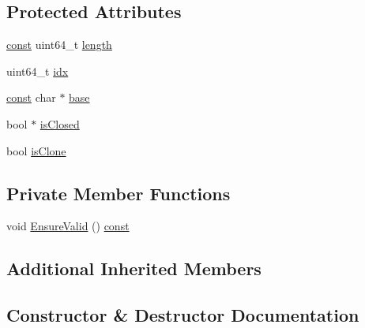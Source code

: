 \subsection*{Protected Attributes}
\begin{DoxyCompactItemize}
\item 
\mbox{\hyperlink{ZlibCrc32_8h_a2c212835823e3c54a8ab6d95c652660e}{const}} uint64\+\_\+t \mbox{\hyperlink{classlucene_1_1core_1_1store_1_1ByteBufferIndexInput_acc7f63d7cbe6fe5047d6f2ef2d3f28bf}{length}}
\item 
uint64\+\_\+t \mbox{\hyperlink{classlucene_1_1core_1_1store_1_1ByteBufferIndexInput_aa510850cba346941ab86be69a7d2233a}{idx}}
\item 
\mbox{\hyperlink{ZlibCrc32_8h_a2c212835823e3c54a8ab6d95c652660e}{const}} char $\ast$ \mbox{\hyperlink{classlucene_1_1core_1_1store_1_1ByteBufferIndexInput_a71a9d4cb7cb207d2db8f8ed32c9fcf2b}{base}}
\item 
bool $\ast$ \mbox{\hyperlink{classlucene_1_1core_1_1store_1_1ByteBufferIndexInput_a9a52acb361a9ac261f4477d464c14241}{is\+Closed}}
\item 
bool \mbox{\hyperlink{classlucene_1_1core_1_1store_1_1ByteBufferIndexInput_a972eb08d337dcec62b415784f6aa2788}{is\+Clone}}
\end{DoxyCompactItemize}
\subsection*{Private Member Functions}
\begin{DoxyCompactItemize}
\item 
void \mbox{\hyperlink{classlucene_1_1core_1_1store_1_1ByteBufferIndexInput_a13d27be6b5df008a8fd9f6c6871ce8bc}{Ensure\+Valid}} () \mbox{\hyperlink{ZlibCrc32_8h_a2c212835823e3c54a8ab6d95c652660e}{const}}
\end{DoxyCompactItemize}
\subsection*{Additional Inherited Members}


\subsection{Constructor \& Destructor Documentation}
\mbox{\label{classlucene_1_1core_1_1store_1_1ByteBufferIndexInput_a3227090a947ac3f64f7fc1b3cff74a23}} 
